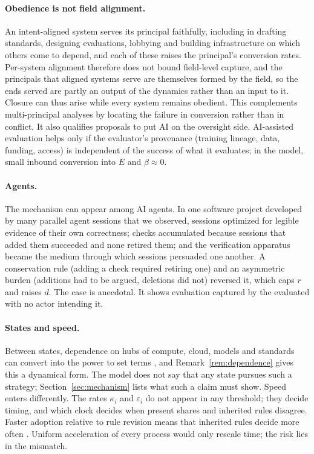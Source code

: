 \documentclass[letterpaper]{article} %
\theoremstyle{definition}
\begin{document}
\paragraph{Obedience is not field alignment.} An intent-aligned system serves its principal faithfully, including in drafting standards, designing evaluations, lobbying and building infrastructure on which others come to depend, and each of these raises the principal's conversion rates. Per-system alignment therefore does not bound field-level capture, and the principals that aligned systems serve are themselves formed by the field, so the ends served are partly an output of the dynamics rather than an input to it. Closure can thus arise while every system remains obedient. This complements multi-principal analyses \citep{critch2020,gabriel2020,hammond2025} by locating the failure in conversion rather than in conflict. It also qualifies proposals to put AI on the oversight side. AI-assisted evaluation helps only if the evaluator's provenance (training lineage, data, funding, access) is independent of the success of what it evaluates; in the model, small inbound conversion into $E$ and $\beta\approx0$.

\paragraph{Agents.} The mechanism can appear among AI agents. In one software project developed by many parallel agent sessions that we observed, sessions optimized for legible evidence of their own correctness; checks accumulated because sessions that added them succeeded and none retired them; and the verification apparatus became the medium through which sessions persuaded one another. A conservation rule (adding a check required retiring one) and an asymmetric burden (additions had to be argued, deletions did not) reversed it, which caps $r$ and raises $d$. The case is anecdotal. It shows evaluation captured by the evaluated with no actor intending it.

\paragraph{States and speed.} Between states, dependence on hubs of compute, cloud, models and standards can convert into the power to set terms \citep{farrell2019}, and Remark~\ref{rem:dependence} gives this a dynamical form. The model does not say that any state pursues such a strategy; Section~\ref{sec:mechanism} lists what such a claim must show. Speed enters differently. The rates $\kappa_i$ and $\varepsilon_i$ do not appear in any threshold; they decide timing, and which clock decides when present shares and inherited rules disagree. Faster adoption relative to rule revision means that inherited rules decide more often \citep{marchant2011}. Uniform acceleration of every process would only rescale time; the risk lies in the mismatch.
\end{document}
